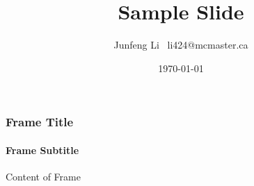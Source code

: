 \documentclass{beamer}
\title{Sample Slide}
\author{Junfeng Li \ li424@mcmaster.ca}
\date{\today}
\begin{document}
\begin{frame}
    \maketitle
\end{frame}

\begin{frame}
    \frametitle{Frame Title}
    \framesubtitle{Frame Subtitle}
    Content of Frame
\end{frame}
\end{document}
